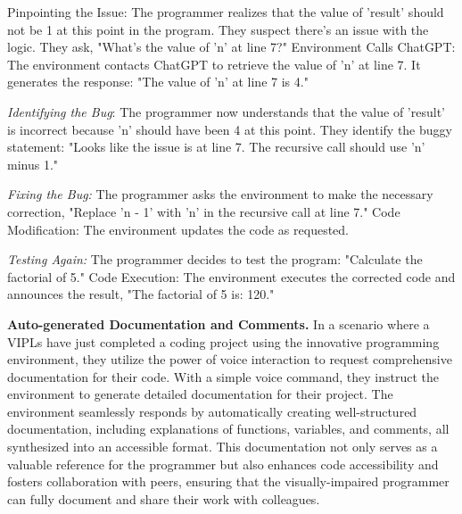 Pinpointing the Issue: The programmer realizes that the value of
'result' should not be 1 at this point in the program. They suspect
there's an issue with the logic.  They ask, "What's the value of 'n'
at line 7?"  Environment Calls ChatGPT: The environment contacts
ChatGPT to retrieve the value of 'n' at line 7. It generates the
response: "The value of 'n' at line 7 is 4."

{\em Identifying the Bug}: The programmer now understands that the
value of 'result' is incorrect because 'n' should have been 4 at this
point. They identify the buggy statement: "Looks like the issue is at
line 7. The recursive call should use 'n' minus 1."

{\em Fixing the Bug:} The programmer asks the environment to make the
necessary correction, "Replace 'n - 1' with 'n' in the recursive call
at line 7."  Code Modification: The environment updates the code as
requested.

{\em Testing Again:} The programmer decides to test the program: "Calculate the factorial of 5."  Code Execution: The
environment executes the corrected code and announces the result, "The
factorial of 5 is: 120."

{\bf Auto-generated Documentation and Comments.} In a scenario where a
VIPLs have just completed a coding project using the innovative
programming environment, they utilize the power of voice interaction
to request comprehensive documentation for their code. With a simple
voice command, they instruct the environment to generate detailed
documentation for their project. The environment seamlessly responds
by automatically creating well-structured documentation, including
explanations of functions, variables, and comments, all synthesized
into an accessible format. This documentation not only serves as a
valuable reference for the programmer but also enhances code
accessibility and fosters collaboration with peers, ensuring that the
visually-impaired programmer can fully document and share their work
with colleagues.








